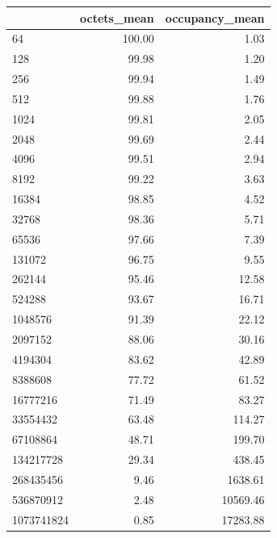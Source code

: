 \begin{tabular}{lrr}
\toprule
 & octets_mean & occupancy_mean \\
\midrule
64 & 100.00 & 1.03 \\
128 & 99.98 & 1.20 \\
256 & 99.94 & 1.49 \\
512 & 99.88 & 1.76 \\
1024 & 99.81 & 2.05 \\
2048 & 99.69 & 2.44 \\
4096 & 99.51 & 2.94 \\
8192 & 99.22 & 3.63 \\
16384 & 98.85 & 4.52 \\
32768 & 98.36 & 5.71 \\
65536 & 97.66 & 7.39 \\
131072 & 96.75 & 9.55 \\
262144 & 95.46 & 12.58 \\
524288 & 93.67 & 16.71 \\
1048576 & 91.39 & 22.12 \\
2097152 & 88.06 & 30.16 \\
4194304 & 83.62 & 42.89 \\
8388608 & 77.72 & 61.52 \\
16777216 & 71.49 & 83.27 \\
33554432 & 63.48 & 114.27 \\
67108864 & 48.71 & 199.70 \\
134217728 & 29.34 & 438.45 \\
268435456 & 9.46 & 1638.61 \\
536870912 & 2.48 & 10569.46 \\
1073741824 & 0.85 & 17283.88 \\
\bottomrule
\end{tabular}
